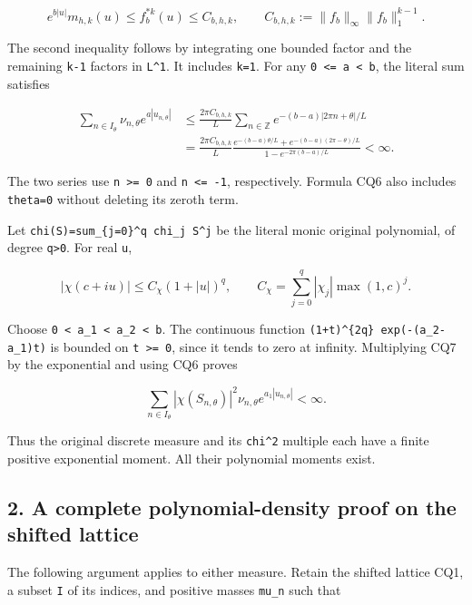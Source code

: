 \[
e^{b|u|}m_{h,k}(u)
\le f_b^{*k}(u)
\le C_{b,h,k},\qquad
C_{b,h,k}:=\|f_b\|_\infty\|f_b\|_1^{k-1}.
\tag{CQ5}
\]

The second inequality follows by integrating one bounded factor and the remaining \texttt{k-1} factors in \texttt{L\^{}1}. It includes \texttt{k=1}. For any \texttt{0\ \textless{}=\ a\ \textless{}\ b}, the literal sum satisfies

\[
\begin{aligned}
\sum_{n\in I_\theta}\nu_{n,\theta}e^{a|u_{n,\theta}|}
&\le\frac{2\pi C_{b,h,k}}L
\sum_{n\in\mathbb Z}e^{-(b-a)|2\pi n+\theta|/L}\\
&=\frac{2\pi C_{b,h,k}}L
\frac{e^{-(b-a)\theta/L}+e^{-(b-a)(2\pi-\theta)/L}}
{1-e^{-2\pi(b-a)/L}}<\infty.
\end{aligned}
\tag{CQ6}
\]

The two series use \texttt{n\ \textgreater{}=\ 0} and \texttt{n\ \textless{}=\ -1}, respectively. Formula CQ6 also includes \texttt{theta=0} without deleting its zeroth term.

Let \texttt{chi(S)=sum\_\{j=0\}\^{}q\ chi\_j\ S\^{}j} be the literal monic original polynomial, of degree \texttt{q\textgreater{}0}. For real \texttt{u},

\[
|\chi(c+iu)|\le
C_\chi(1+|u|)^q,\qquad
C_\chi=\sum_{j=0}^q|\chi_j|\max(1,c)^j.
\tag{CQ7}
\]

Choose \texttt{0\ \textless{}\ a\_1\ \textless{}\ a\_2\ \textless{}\ b}. The continuous function \texttt{(1+t)\^{}\{2q\}\ exp(-(a\_2-a\_1)t)} is bounded on \texttt{t\ \textgreater{}=\ 0}, since it tends to zero at infinity. Multiplying CQ7 by the exponential and using CQ6 proves

\[
\sum_{n\in I_\theta}
|\chi(S_{n,\theta})|^2\nu_{n,\theta}
e^{a_1|u_{n,\theta}|}<\infty.
\tag{CQ8}
\]

Thus the original discrete measure and its \texttt{\textbar{}chi\textbar{}\^{}2} multiple each have a finite positive exponential moment. All their polynomial moments exist.

\subsection{2. A complete polynomial-density proof on the shifted lattice}\label{a-complete-polynomial-density-proof-on-the-shifted-lattice}

The following argument applies to either measure. Retain the shifted lattice CQ1, a subset \texttt{I} of its indices, and positive masses \texttt{mu\_n} such that


